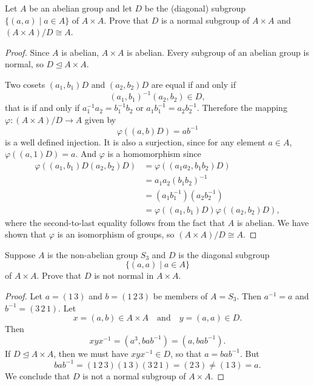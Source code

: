  Let $A$ be an abelian group and let $D$ be the
(diagonal) subgroup $\{(a,a)\mid a\in A\}$ of $A\times A$. Prove that
$D$ is a normal subgroup of $A\times A$ and $(A\times A)/D\cong A$.
\begin{proof}
  Since $A$ is abelian, $A\times A$ is abelian. Every subgroup of an
  abelian group is normal, so $D\trianglelefteq A\times A$.

  Two cosets $(a_1,b_1)D$ and $(a_2,b_2)D$ are equal if and only if
  \begin{equation*}
    (a_1,b_1)^{-1}(a_2,b_2)\in D,
  \end{equation*}
  that is if and only if $a_1^{-1}a_2 = b_1^{-1}b_2$ or
  $a_1b_1^{-1} = a_2b_2^{-1}$. Therefore the mapping
  $\varphi\colon(A\times A)/D\to A$ given by
  \begin{equation*}
    \varphi((a,b)D) = ab^{-1}
  \end{equation*}
  is a well defined injection. It is also a surjection, since for any
  element $a\in A$, $\varphi((a,1)D) = a$. And $\varphi$ is a
  homomorphism since
  \begin{align*}
    \varphi((a_1,b_1)D(a_2,b_2)D)
    &= \varphi((a_1a_2,b_1b_2)D) \\
    &= a_1a_2(b_1b_2)^{-1} \\
    &= (a_1b_1^{-1})(a_2b_2^{-1}) \\
    &= \varphi((a_1,b_1)D)\varphi((a_2,b_2)D),
  \end{align*}
  where the second-to-last equality follows from the fact that $A$ is
  abelian. We have shown that $\varphi$ is an isomorphism of groups,
  so $(A\times A)/D\cong A$.
\end{proof}

 Suppose $A$ is the non-abelian group $S_3$ and $D$ is
the diagonal subgroup
\begin{equation*}
  \{(a,a)\mid a\in A\}
\end{equation*}
of $A\times A$. Prove that $D$ is not normal in $A\times A$.
\begin{proof}
  Let $a = (1\,3)$ and $b = (1\,2\,3)$ be members of $A = S_3$. Then
  $a^{-1} = a$ and $b^{-1} = (3\,2\,1)$. Let
  \begin{equation*}
    x = (a,b)\in A\times A
    \quad\text{and}\quad
    y = (a,a)\in D.
  \end{equation*}
  Then
  \begin{equation*}
    xyx^{-1} = (a^3, bab^{-1}) = (a, bab^{-1}).
  \end{equation*}
  If $D\trianglelefteq A\times A$, then we must have $xyx^{-1}\in D$,
  so that $a = bab^{-1}$. But
  \begin{equation*}
    bab^{-1} = (1\,2\,3)(1\,3)(3\,2\,1) = (2\,3) \neq (1\,3) = a.
  \end{equation*}
  We conclude that $D$ is not a normal subgroup of $A\times A$.
\end{proof}

